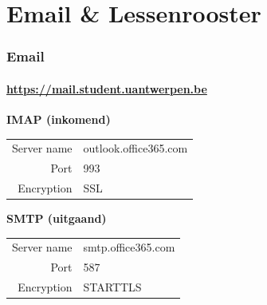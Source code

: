 \section{Email \& Lessenrooster}
\begin{frame}
	\frametitle{Email}
	\framesubtitle{\url{https://mail.student.uantwerpen.be}}
    \begin{center}
    \end{center}
   	\textbf{IMAP (inkomend)}
    \begin{tabularx}{\linewidth}{rX}
      Server name & outlook.office365.com \\
      Port & 993 \\
      Encryption & SSL \\
	\end{tabularx} \vspace{0.5cm}
    
	\textbf{SMTP (uitgaand)}
    \begin{tabularx}{\linewidth}{rX}
      Server name & smtp.office365.com \\
      Port & 587 \\
      Encryption & STARTTLS \\
	\end{tabularx} \vspace{0.5cm}
    
\end{frame}
    
